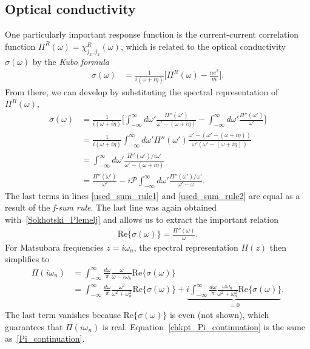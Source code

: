 \documentclass[notitlepage, 11pt, nofootinbib]{revtex4-1}
\begin{document}
\subsection{Optical conductivity}

One particularly important response function is the current-current correlation function $\Pi^R(\omega) = \chi_{j_x,j_x}^R(\omega)$, which is related to the optical conductivity $\sigma(\omega)$ by the \emph{Kubo formula}
\begin{align}
\sigma(\omega)
&=
\frac{1}{i(\omega + i\eta)}\bigg[\Pi^R(\omega)-\frac{ne^2}{m}\bigg].
\label{used_sum_rule1}
\end{align}
From there, we can develop by substituting the spectral representation of $\Pi^{R}(\omega)$,
\begin{align}
\sigma(\omega)&=
\frac{1}{i(\omega + i\eta)}
\bigg[
\int_{-\infty}^{\infty}d\omega'\frac{\Pi''(\omega')}{\omega'-(\omega+i\eta)}
-\int_{-\infty}^{\infty}d\omega'\frac{\Pi''(\omega')}{\omega'}
\bigg]
\label{used_sum_rule2}
\\
&=
\frac{1}{i(\omega + i\eta)}
\int_{-\infty}^{\infty}d\omega'
\Pi''(\omega') 
\frac{\omega'-(\omega'-(\omega+i\eta))}{\omega'(\omega'-(\omega+i\eta))}
\\
&=
\int_{-\infty}^{\infty}d\omega'\frac{\Pi''(\omega')/i\omega'}{\omega'-(\omega+i\eta)}
\\
&=
\frac{\Pi''(\omega')}{\omega'}
-i\mathcal P \int_{-\infty}^{\infty}d\omega'\frac{\Pi''(\omega')/\omega'}{\omega'-\omega}.
\label{conductivity_spectral}
\end{align}
The last terms in lines \eqref{used_sum_rule1} and \eqref{used_sum_rule2} are equal as a result of the \emph{f-sum rule}. The last line was again obtained with~\eqref{Sokhotski_Plemelj} and allows us to extract the important relation
\begin{align}
\text{Re}\{ \sigma(\omega) \} = \frac{\Pi''(\omega)}{\omega}.
\end{align}
For Matsubara frequencies $z=i\omega_n$, the spectral representation $\Pi(z)$ then simplifies to
\begin{align}
\Pi(i\omega_n) 
&=
\int_{-\infty}^{\infty} \frac{d\omega}{\pi}\frac{\omega}{\omega-i\omega_n}\text{Re}\{ \sigma(\omega) \}
\label{chkpt_Pi_continuation_1}
\\
&=
\int_{-\infty}^{\infty} \frac{d\omega}{\pi} \frac{\omega^2}{\omega^2+\omega_n^2}
\text{Re}\{ \sigma(\omega) \}
+
\underbrace{i
\int_{-\infty}^{\infty} \frac{d\omega}{\pi} \frac{\omega\omega_n}{\omega^2+\omega_n^2}
\text{Re}\{ \sigma(\omega) \}
}_{=0}.
\label{chkpt_Pi_continuation}
\end{align}
The last term vanishes because $\text{Re}\{\sigma(\omega)\}$ is even (not shown), which guarantees that $\Pi(i\omega_n)$ is real. Equation~\eqref{chkpt_Pi_continuation} is the same as~\eqref{Pi_continuation}.
\end{document}
